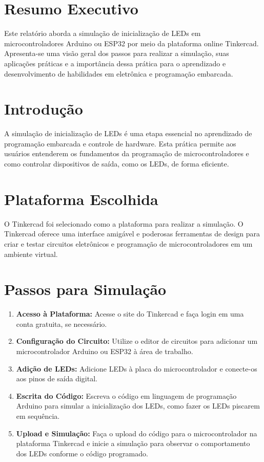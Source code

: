 \documentclass{estacio}
\begin{document}
\maketitle

\section{Resumo Executivo}
Este relatório aborda a simulação de inicialização de LEDs em microcontroladores Arduino ou ESP32 por meio da plataforma online Tinkercad. Apresenta-se uma visão geral dos passos para realizar a simulação, suas aplicações práticas e a importância dessa prática para o aprendizado e desenvolvimento de habilidades em eletrônica e programação embarcada.

\section{Introdução}
A simulação de inicialização de LEDs é uma etapa essencial no aprendizado de programação embarcada e controle de hardware. Esta prática permite aos usuários entenderem os fundamentos da programação de microcontroladores e como controlar dispositivos de saída, como os LEDs, de forma eficiente.

\section{Plataforma Escolhida}
O Tinkercad foi selecionado como a plataforma para realizar a simulação. O Tinkercad oferece uma interface amigável e poderosas ferramentas de design para criar e testar circuitos eletrônicos e programação de microcontroladores em um ambiente virtual.

\section{Passos para Simulação}
\begin{enumerate}
    \item \textbf{Acesso à Plataforma:} Acesse o site do Tinkercad e faça login em uma conta gratuita, se necessário.
    \item \textbf{Configuração do Circuito:} Utilize o editor de circuitos para adicionar um microcontrolador Arduino ou ESP32 à área de trabalho.
    \item \textbf{Adição de LEDs:} Adicione LEDs à placa do microcontrolador e conecte-os aos pinos de saída digital.
    \item \textbf{Escrita do Código:} Escreva o código em linguagem de programação Arduino para simular a inicialização dos LEDs, como fazer os LEDs piscarem em sequência.
    \item \textbf{Upload e Simulação:} Faça o upload do código para o microcontrolador na plataforma Tinkercad e inicie a simulação para observar o comportamento dos LEDs conforme o código programado.
\end{enumerate}
\end{document}
